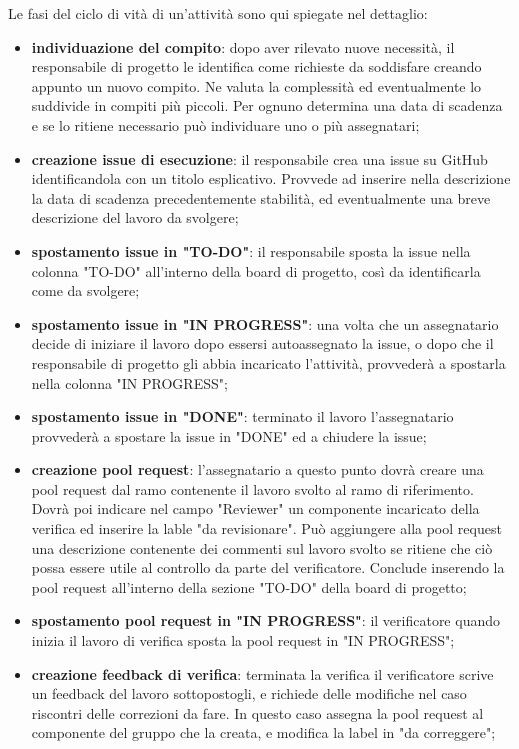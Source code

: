 Le fasi del ciclo di vità di un'attività sono qui spiegate nel dettaglio:
\begin{itemize}
    \item \textbf{individuazione del compito}: dopo aver rilevato nuove necessità, il responsabile di progetto le identifica come richieste da soddisfare creando appunto un nuovo compito. Ne valuta la complessità ed eventualmente lo suddivide in compiti più piccoli. Per ognuno determina una data di scadenza e se lo ritiene necessario può individuare uno o più assegnatari;
    \item \textbf{creazione issue di esecuzione}: il responsabile crea una issue su GitHub identificandola con un titolo esplicativo. Provvede ad inserire nella descrizione la data di scadenza precedentemente stabilità, ed eventualmente una breve descrizione del lavoro da svolgere;
    \item \textbf{spostamento issue in "TO-DO"}: il responsabile sposta la issue nella colonna "TO-DO" all'interno della board di progetto, così da identificarla come da svolgere;
    \item \textbf{spostamento issue in "IN PROGRESS"}: una volta che un assegnatario decide di iniziare il lavoro dopo essersi autoassegnato la issue, o dopo che il responsabile di progetto gli abbia incaricato l'attività, provvederà a spostarla nella colonna "IN PROGRESS";
    \item \textbf{spostamento issue in "DONE"}: terminato il lavoro l'assegnatario provvederà a spostare la issue in "DONE" ed a chiudere la issue;
    \item \textbf{creazione pool request}: l'assegnatario a questo punto dovrà creare una pool request dal ramo contenente il lavoro svolto al ramo di riferimento. Dovrà poi indicare nel campo "Reviewer" un componente incaricato della verifica ed inserire la lable "da revisionare". Può aggiungere alla pool request una descrizione contenente dei commenti sul lavoro svolto se ritiene che ciò possa essere utile al controllo da parte del verificatore. Conclude inserendo la pool request all'interno della sezione "TO-DO" della board di progetto;
    \item \textbf{spostamento pool request in "IN PROGRESS"}: il verificatore quando inizia il lavoro di verifica sposta la pool request in "IN PROGRESS";
    \item \textbf{creazione feedback di verifica}: terminata la verifica il verificatore scrive un feedback del lavoro sottopostogli, e richiede delle modifiche nel caso riscontri delle correzioni da fare. In questo caso assegna la pool request al componente del gruppo che la creata, e modifica la label in "da correggere";

\end{itemize}
